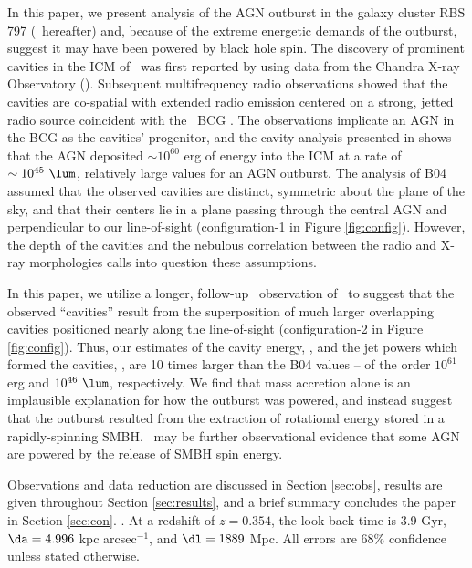 \documentclass[iop]{emulateapj}
\begin{document}
In this paper, we present analysis of the AGN outburst in the galaxy
cluster RBS 797 (\rbs\ hereafter) and, because of the extreme
energetic demands of the outburst, suggest it may have been powered by
black hole spin. The discovery of prominent cavities in the ICM of
\rbs\ was first reported by \citet{schindler01} using data from the
Chandra X-ray Observatory (\cxo). Subsequent multifrequency radio
observations showed that the cavities are co-spatial with extended
radio emission centered on a strong, jetted radio source coincident
with the \rbs\ BCG \citep{2002astro.ph..1349D, gitti06, birzan08}. The
observations implicate an AGN in the BCG as the cavities' progenitor,
and the cavity analysis presented in \citet[][hereafter B04]{birzan04}
shows that the AGN deposited $\sim 10^{60}$ erg of energy into the ICM
at a rate of $\sim 10^{45} ~\lum$, relatively large values for an AGN
outburst. The analysis of B04 assumed that the observed cavities are
distinct, symmetric about the plane of the sky, and that their centers
lie in a plane passing through the central AGN and perpendicular to
our line-of-sight (configuration-1 in Figure
\ref{fig:config}). However, the depth of the cavities and the nebulous
correlation between the radio and X-ray morphologies calls into
question these assumptions.

In this paper, we utilize a longer, follow-up \cxo\ observation of
\rbs\ to suggest that the observed ``cavities'' result from the
superposition of much larger overlapping cavities positioned nearly
along the line-of-sight (configuration-2 in Figure
\ref{fig:config}). Thus, our estimates of the cavity energy, \ecav,
and the jet powers which formed the cavities, \pjet, are 10 times
larger than the B04 values -- of the order $10^{61}$ erg and $10^{46}
~\lum$, respectively. We find that mass accretion alone is an
implausible explanation for how the outburst was powered, and instead
suggest that the outburst resulted from the extraction of rotational
energy stored in a rapidly-spinning SMBH. \rbs\ may be further
observational evidence that some AGN are powered by the release of
SMBH spin energy.

Observations and data reduction are discussed in Section
\ref{sec:obs}, results are given throughout Section \ref{sec:results},
and a brief summary concludes the paper in Section
\ref{sec:con}. \LCDM. At a redshift of $z = 0.354$, the look-back time
is 3.9 Gyr, $\da = 4.996$ kpc arcsec$^{-1}$, and $\dl = 1889$ Mpc. All
errors are 68\% confidence unless stated otherwise.
\end{document}
